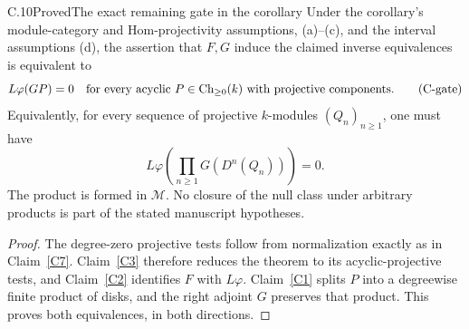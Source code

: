 \begin{claim}{C.10}{Proved}{The exact remaining gate in the corollary}\label{C10}
Under the corollary's module-category and Hom-projectivity assumptions, (a)--(c), and the interval assumptions (d), the assertion that $F,G$ induce the claimed inverse equivalences is equivalent to
\[
 L\varphi(GP)=0
 \quad\text{for every acyclic }P\in\operatorname{Ch}_{\geq0}(k)
 \text{ with projective components}.\tag{C-gate}\label{Cgate}
\]
Equivalently, for every sequence of projective $k$-modules $(Q_n)_{n\geq1}$, one must have
\[
 L\varphi\!\left(\prod_{n\geq1}G(D^n(Q_n))\right)=0.
\]
The product is formed in $\mathcal M$. No closure of the null class under arbitrary products is part of the stated manuscript hypotheses.
\end{claim}
\begin{proof}
The degree-zero projective tests follow from normalization exactly as in Claim~\ref{C7}. Claim~\ref{C3} therefore reduces the theorem to its acyclic-projective tests, and Claim~\ref{C2} identifies $F$ with $L\varphi$. Claim~\ref{C1} splits $P$ into a degreewise finite product of disks, and the right adjoint $G$ preserves that product. This proves both equivalences, in both directions.
\end{proof}


